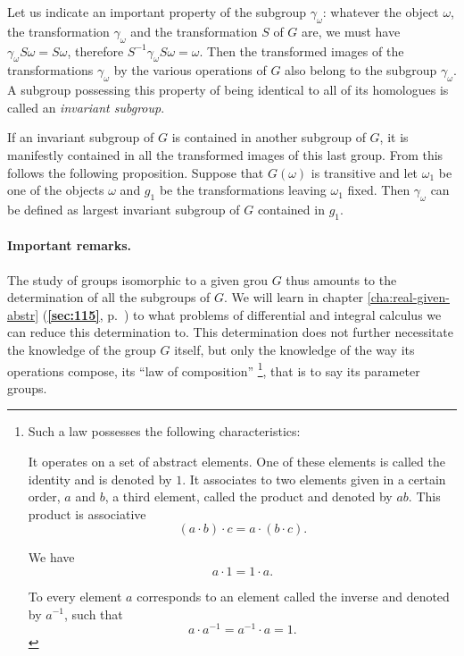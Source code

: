 \documentclass[leqno,11pt]{book}
\numberwithin{equation}{chapter}
\theoremstyle{shape1}
\theoremstyle{shapesmall}
\newcommand{\fsref}[1]{{\rm\textsection\textbf{\ref{sec:#1}}}}
\newcommand{\somespace}{\vspace{9pt}}
\begin{document}
\somespace

Let us indicate an important property of the subgroup $\gamma_{\omega}$: whatever the object $\omega$, the transformation $\gamma_{\omega}$ and the transformation $S$ of $G$ are, we must have $\gamma_{\omega}S\omega=S\omega$, therefore $S^{-1}\gamma_{\omega}S\omega=\omega$. Then the transformed images of the transformations $\gamma_{\omega}$ by the various operations of $G$ also belong to the subgroup $\gamma_{\omega}$. A subgroup possessing this property of being identical to all of its homologues is called an \emph{invariant subgroup}.

If an invariant subgroup of $G$ is contained in another subgroup of $G$, it is manifestly contained in all the transformed images of this last group. From this follows the following proposition. Suppose that $G(\omega)$ is transitive and let $\omega_{1}$ be one of the objects $\omega$ and $g_{1}$ be the transformations leaving $\omega_{1}$ fixed. Then $\gamma_{\omega}$ can be defined as largest invariant subgroup of $G$ contained in $g_{1}$.

\paragraph{Important remarks.}
\label{sec:98}
The study of groups isomorphic to a given grou $G$ thus amounts to the determination of all the subgroups of $G$. We will learn in chapter \ref{cha:real-given-abstr} (\fsref{115}, p.~\pageref{sec:115}) to what problems of differential and integral calculus we can reduce this determination to. This determination does not further necessitate the knowledge of the group $G$ itself, but only the knowledge of the way its operations compose, its ``law of composition''  \footnote{Such a law possesses the following characteristics:

It operates on a set of abstract elements. One of these elements is called the identity and is denoted by $1$. It associates to two elements given in a certain order, $a$ and $b$, a third element, called the product and denoted by $ab$. This product is associative
\[
(a\cdot b)\cdot c=a\cdot(b\cdot c).
\]

We have
\[
a\cdot 1=1\cdot a.
\]

To every element $a$ corresponds to an element called the inverse and denoted by $a^{-1}$, such that
\[
a\cdot a^{-1}=a^{-1}\cdot a=1.
\]
}, that is to say its parameter groups.
\end{document}

